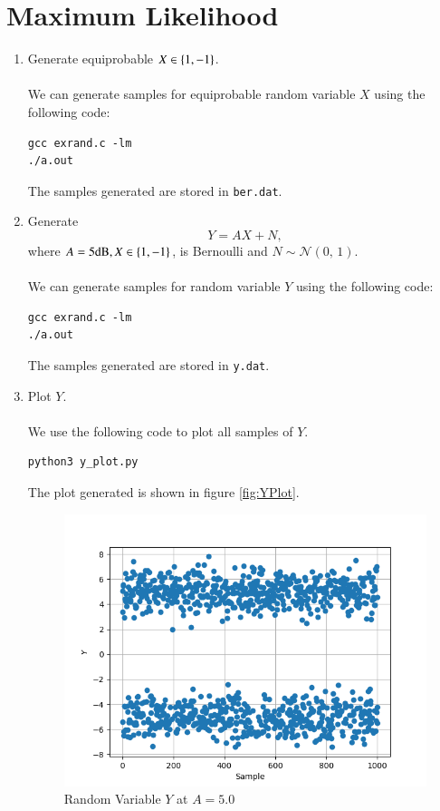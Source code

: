 \documentclass[journal,12pt,twocolumn]{IEEEtran}
\renewcommand\thesection{\arabic{section}}
\begin{document}
\section{Maximum Likelihood}
\begin{enumerate}[label=\thesection.\arabic*
,ref=\thesection.\theenumi]

\item Generate equiprobable $X \in \left\{1,-1\right\}$.
	\\
	\solution
	\\
	We can generate samples for equiprobable random variable $X$ using the following code:
	\begin{lstlisting}
gcc exrand.c -lm
./a.out
	\end{lstlisting}
	The samples generated are stored in \verb|ber.dat|.

\item Generate 
	\begin{equation}
	Y = AX+N,
	\end{equation}
		where $A = 5 \text{dB}, X \in \left\{1,-1\right\}$, is Bernoulli and $N \sim \mathcal{N}(0,\,1)$.
	\\
	\solution
	\\
	We can generate samples for random variable $Y$ using the following code:
	\begin{lstlisting}
gcc exrand.c -lm
./a.out
	\end{lstlisting}
	The samples generated are stored in \verb|y.dat|.

\item Plot $Y$.
	\\
	\solution
	\\
	We use the following code to plot all samples of $Y$.
	\begin{lstlisting}
python3 y_plot.py
	\end{lstlisting}
	The plot generated is shown in figure \eqref{fig:YPlot}.

	\begin{figure}
	\centering
	\includegraphics[width=\columnwidth]{../figs/y_plot.png}
	\caption{Random Variable $Y$ at $A = 5.0$}
	\label{fig:YPlot}
	\end{figure}


\end{enumerate}
\end{document}
